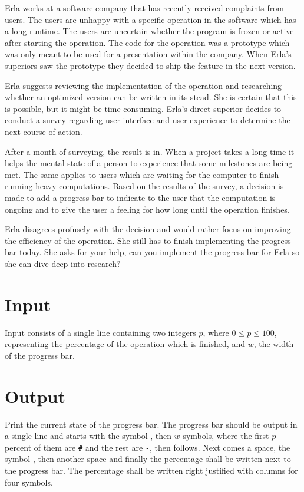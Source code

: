 
Erla works at a software company that has recently received complaints from users.
The users are unhappy with a specific operation in the software which has a long runtime.
The users are uncertain whether the program is frozen or active after starting the operation.
The code for the operation was a prototype which was only meant to be used for a presentation within the company.
When Erla's superiors saw the prototype they decided to ship the feature in the next version.

Erla suggests reviewing the implementation of the operation and researching whether an optimized version can be written in its stead.
She is certain that this is possible, but it might be time consuming.
Erla's direct superior decides to conduct a survey regarding user interface and user experience to determine the next course of action.

After a month of surveying, the result is in.
When a project takes a long time it helps the mental state of a person to experience that some milestones are being met.
The same applies to users which are waiting for the computer to finish running heavy computations.
Based on the results of the survey, a decision is made to add a progress bar to indicate to the user that the computation is ongoing and to give the user a feeling for how long until the operation finishes.

Erla disagrees profusely with the decision and would rather focus on improving the efficiency of the operation.
She still has to finish implementing the progress bar today.
She asks for your help, can you implement the progress bar for Erla so she can dive deep into research?


\section*{Input}
Input consists of a single line containing two integers $p$, where $0 \leq p \leq 100$, representing the percentage of the operation which is finished, and $w$, the width of the progress bar.

\section*{Output}
Print the current state of the progress bar.
The progress bar should be output in a single line and starts with the symbol \texttt{\lbrack}, then $w$ symbols, where the first $p$ percent of them are \texttt{\#} and the rest are \texttt{-}, then \texttt{\rbrack} follows.
Next comes a space, the symbol \texttt{\textbar}, then another space and finally the percentage shall be written next to the progress bar.
The percentage shall be written right justified with columns for four symbols.

